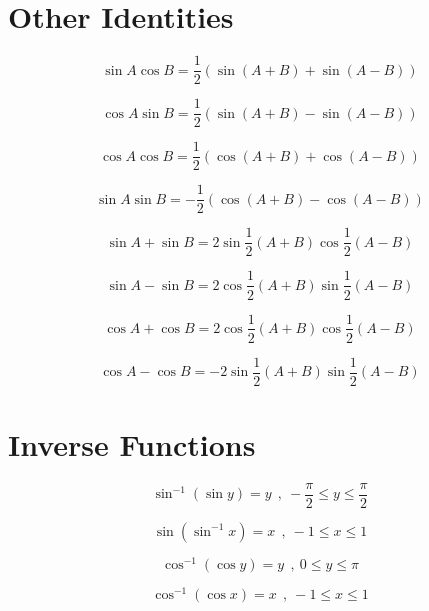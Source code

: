 \documentclass[a4paper]{book}
\begin{document}
\section{Other Identities}
\begin{description}
\item \begin{equation} \sin A \cos B = \frac{1}{2} (\sin(A + B) + \sin(A - B)) \end{equation}
\item \begin{equation} \cos A \sin B = \frac{1}{2} (\sin(A + B) - \sin(A - B)) \end{equation}
\item \begin{equation} \cos A \cos B = \frac{1}{2} (\cos(A + B) + \cos(A - B)) \end{equation}
\item \begin{equation} \sin A \sin B = -\frac{1}{2} (\cos(A + B) - \cos(A - B)) \end{equation}
\item \begin{equation} \sin A + \sin B = 2 \sin \frac{1}{2} (A+B) \cos \frac{1}{2}(A - B) \end{equation}
\item \begin{equation} \sin A - \sin B = 2 \cos \frac{1}{2} (A+B)  \sin \frac{1}{2}(A - B) \end{equation}
\item \begin{equation} \cos A + \cos B = 2 \cos \frac{1}{2} (A+B) \cos \frac{1}{2}(A - B) \end{equation}
\item \begin{equation} \cos A - \cos B = -2 \sin \frac{1}{2} (A+B)  \sin \frac{1}{2}(A - B) \end{equation}
\end{description}

\section{Inverse Functions}
\begin{description}
\item \begin{equation} \sin^{-1}(\sin y) = y\ \ ,\ -\frac{\pi}{2} \le y \le \frac{\pi}{2} \end{equation}
\item \begin{equation} \sin(\sin^{-1} x) = x\ \ ,\ -1 \le x \le 1 \end{equation}
\item \begin{equation} \cos^{-1}(\cos y) = y\ \ ,\ 0 \le y \le \pi \end{equation}
\item \begin{equation} \cos^{-1}(\cos x) = x\ \ ,\ -1 \le x \le 1 \end{equation}
\end{description}
\end{document}
